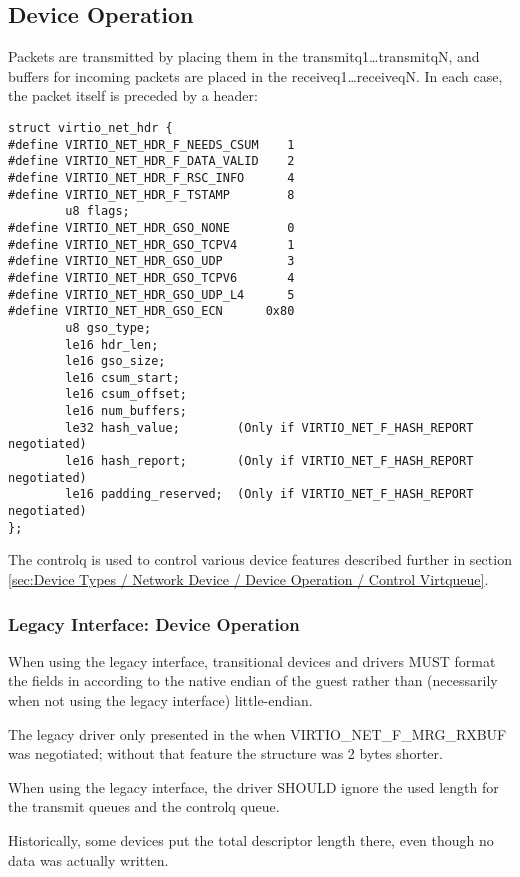 \subsection{Device Operation}\label{sec:Device Types / Network Device / Device Operation}

Packets are transmitted by placing them in the
transmitq1\ldots transmitqN, and buffers for incoming packets are
placed in the receiveq1\ldots receiveqN. In each case, the packet
itself is preceded by a header:

\begin{lstlisting}
struct virtio_net_hdr {
#define VIRTIO_NET_HDR_F_NEEDS_CSUM    1
#define VIRTIO_NET_HDR_F_DATA_VALID    2
#define VIRTIO_NET_HDR_F_RSC_INFO      4
#define VIRTIO_NET_HDR_F_TSTAMP        8
        u8 flags;
#define VIRTIO_NET_HDR_GSO_NONE        0
#define VIRTIO_NET_HDR_GSO_TCPV4       1
#define VIRTIO_NET_HDR_GSO_UDP         3
#define VIRTIO_NET_HDR_GSO_TCPV6       4
#define VIRTIO_NET_HDR_GSO_UDP_L4      5
#define VIRTIO_NET_HDR_GSO_ECN      0x80
        u8 gso_type;
        le16 hdr_len;
        le16 gso_size;
        le16 csum_start;
        le16 csum_offset;
        le16 num_buffers;
        le32 hash_value;        (Only if VIRTIO_NET_F_HASH_REPORT negotiated)
        le16 hash_report;       (Only if VIRTIO_NET_F_HASH_REPORT negotiated)
        le16 padding_reserved;  (Only if VIRTIO_NET_F_HASH_REPORT negotiated)
};
\end{lstlisting}

The controlq is used to control various device features described further in
section \ref{sec:Device Types / Network Device / Device Operation / Control Virtqueue}.

\subsubsection{Legacy Interface: Device Operation}\label{sec:Device Types / Network Device / Device Operation / Legacy Interface: Device Operation}
When using the legacy interface, transitional devices and drivers
MUST format the fields in 
according to the native endian of the guest rather than
(necessarily when not using the legacy interface) little-endian.

The legacy driver only presented  in the 
when VIRTIO_NET_F_MRG_RXBUF was negotiated; without that feature the
structure was 2 bytes shorter.

When using the legacy interface, the driver SHOULD ignore the
used length for the transmit queues
and the controlq queue.
\begin{note}
Historically, some devices put
the total descriptor length there, even though no data was
actually written.
\end{note}

